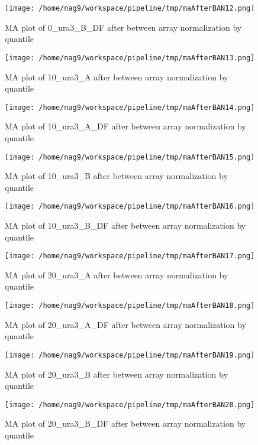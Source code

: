 \documentclass[titlepage]{article}
\begin{document}
\begin{figure}[htb!]
\centering
\texttt{[image: /home/nag9/workspace/pipeline/tmp/maAfterBAN12.png]}
\caption{MA plot of 0\_ura3\_B\_DF after between array normalization by quantile}
\end{figure}\pagebreak
\begin{figure}[htb!]
\centering
\texttt{[image: /home/nag9/workspace/pipeline/tmp/maAfterBAN13.png]}
\caption{MA plot of 10\_ura3\_A after between array normalization by quantile}
\end{figure}\pagebreak
\begin{figure}[htb!]
\centering
\texttt{[image: /home/nag9/workspace/pipeline/tmp/maAfterBAN14.png]}
\caption{MA plot of 10\_ura3\_A\_DF after between array normalization by quantile}
\end{figure}\pagebreak
\begin{figure}[htb!]
\centering
\texttt{[image: /home/nag9/workspace/pipeline/tmp/maAfterBAN15.png]}
\caption{MA plot of 10\_ura3\_B after between array normalization by quantile}
\end{figure}\pagebreak
\begin{figure}[htb!]
\centering
\texttt{[image: /home/nag9/workspace/pipeline/tmp/maAfterBAN16.png]}
\caption{MA plot of 10\_ura3\_B\_DF after between array normalization by quantile}
\end{figure}\pagebreak
\begin{figure}[htb!]
\centering
\texttt{[image: /home/nag9/workspace/pipeline/tmp/maAfterBAN17.png]}
\caption{MA plot of 20\_ura3\_A after between array normalization by quantile}
\end{figure}\pagebreak
\begin{figure}[htb!]
\centering
\texttt{[image: /home/nag9/workspace/pipeline/tmp/maAfterBAN18.png]}
\caption{MA plot of 20\_ura3\_A\_DF after between array normalization by quantile}
\end{figure}\pagebreak
\begin{figure}[htb!]
\centering
\texttt{[image: /home/nag9/workspace/pipeline/tmp/maAfterBAN19.png]}
\caption{MA plot of 20\_ura3\_B after between array normalization by quantile}
\end{figure}\pagebreak
\begin{figure}[htb!]
\centering
\texttt{[image: /home/nag9/workspace/pipeline/tmp/maAfterBAN20.png]}
\caption{MA plot of 20\_ura3\_B\_DF after between array normalization by quantile}
\end{figure}\pagebreak
\end{document}
